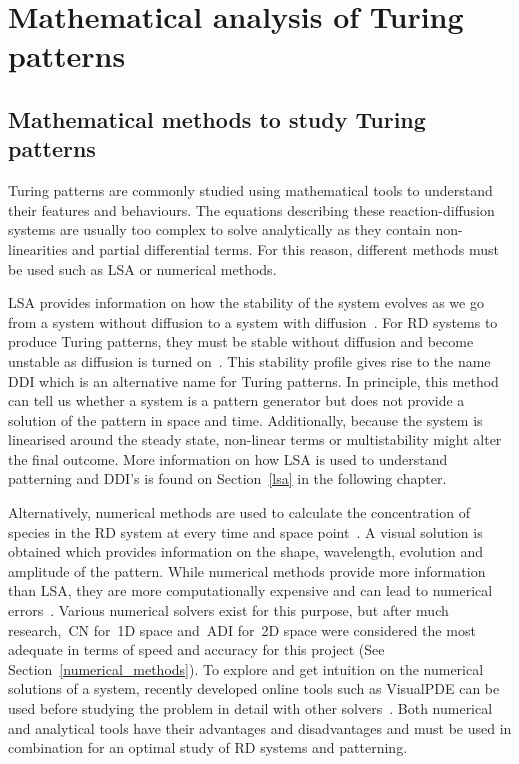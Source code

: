 \section{Mathematical analysis of Turing patterns}

\subsection{Mathematical methods to study Turing patterns}
Turing patterns are commonly studied using mathematical tools to understand their features and behaviours.
The equations describing these reaction-diffusion systems are usually too complex to solve analytically as they contain non-linearities and partial differential terms.
For this reason, different methods must be used such as \acrfull{LSA} or numerical methods.

LSA provides information on how the stability of the system evolves as we go from a system without diffusion to a system with diffusion~\parencite{Glendinning1994}.
For RD systems to produce Turing patterns, they must be stable without diffusion and become unstable as diffusion is turned on~\parencite{J.DMurray2002}.
This stability profile gives rise to the name \acrfull{DDI} which is an alternative name for Turing patterns.
In principle, this method can tell us whether a system is a pattern generator but does not provide a solution of the pattern in space and time. Additionally, because the system is linearised around the steady state, non-linear terms or multistability might alter the final outcome.
More information on how LSA is used to understand patterning and DDI's is found on Section~\ref{lsa} in the following chapter.

Alternatively, numerical methods are used to calculate the concentration of species in the RD system at every time and space point~\parencite{Ramos1983}.
A visual solution is obtained which provides information on the shape, wavelength, evolution and amplitude of the pattern.
While numerical methods provide more information than LSA, they are more computationally expensive and can lead to numerical errors~\parencite{J.DMurray2002}.
Various numerical solvers exist for this purpose, but after much research,~\acrfull{CN} for~\acrshort{1D} space and~\acrfull{ADI} for~\acrshort{2D} space were considered the most adequate in terms of speed and accuracy for this project (See Section~\ref{numerical_methods}).
To explore and get intuition on the numerical solutions of a system, recently developed online tools such as VisualPDE can be used before studying the problem in detail with other solvers~\parencite{Walker2023}.
Both numerical and analytical tools have their advantages and disadvantages and must be used in combination for an optimal study of RD systems and patterning.

